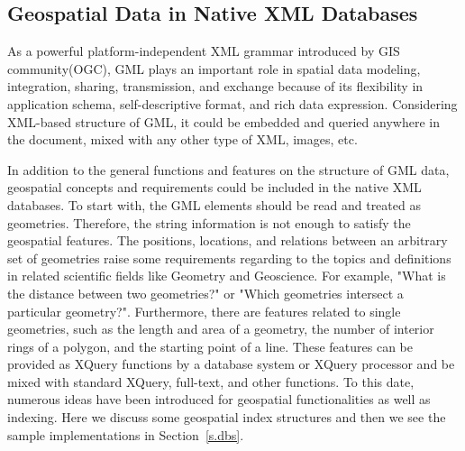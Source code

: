 \documentclass[a4paper,12pt]{article}
\begin{document}
\subsection{Geospatial Data in Native XML Databases}
\label{s.geo-data-in-xml-data}
As a powerful platform-independent XML grammar introduced by GIS community(OGC), GML plays an important role in spatial data modeling, integration, sharing, transmission, and exchange because of its flexibility in application schema, self-descriptive format, and rich data expression. Considering XML-based structure of GML, it could be embedded and queried anywhere in the document, mixed with any other type of XML, images, etc. 

In addition to the general functions and features on the structure of GML data, geospatial concepts and requirements could be included in the native XML databases. To start with, the GML elements should be read and treated as geometries. Therefore, the string information is not enough to satisfy the geospatial features. The positions, locations, and relations between an arbitrary set of geometries raise some requirements regarding to the topics and definitions in related scientific fields like Geometry and Geoscience. For example, "What is the distance between two geometries?" or "Which geometries intersect a particular geometry?". Furthermore, there are features related to single geometries, such as the length and area of a geometry, the number of interior rings of a polygon, and the starting point of a line. These features can be provided as XQuery functions by a database system or XQuery processor and be mixed with standard XQuery, full-text, and other functions.
To this date, numerous ideas have been introduced for geospatial functionalities as well as indexing. Here we discuss some geospatial index structures and then we see the sample implementations in Section~\ref{s.dbs}.


\end{document}
